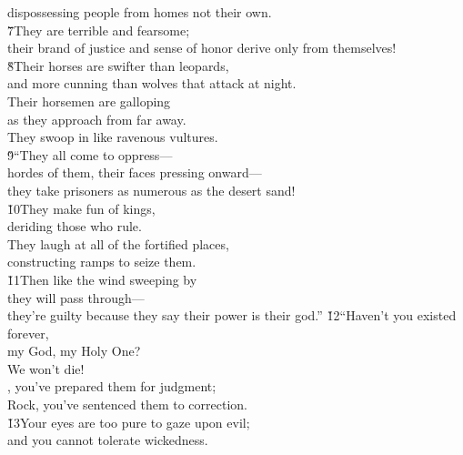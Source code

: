 \begin{poetry}
\poemll    dispossessing people from homes not their own. \\
\poeml \v{7}They are terrible and fearsome; \\
\poemll    their brand of justice and sense of honor derive only from themselves! \\
\poeml \v{8}Their horses are swifter than leopards, \\
\poemll    and more cunning than wolves that attack at night. \\
\poeml Their horsemen are galloping \\
\poemll    as they approach from far away. \\
\poeml They swoop in like ravenous vultures. \\
\poeml \v{9}``They all come to oppress--- \\
\poemll    hordes of them, their faces pressing onward--- \\
\poeml they take prisoners as numerous as the desert sand! \\
\poeml \v{10}They make fun of kings, \\
\poemll    deriding those who rule. \\
\poeml They laugh at all of the fortified places, \\
\poemll    constructing ramps to seize them. \\
\poeml \v{11}Then like the wind sweeping by \\
\poemll    they will pass through--- \\
\poeml they're guilty because they say their power is their god.''
\poeml \v{12}``Haven't you existed forever, \\
\poemll    {} my God, my Holy One? \\
\poemlll       We won't die! \\
\poeml {}, you've prepared them for judgment; \\
\poemll    Rock, you've sentenced them to correction. \\
\poeml \v{13}Your eyes are too pure to gaze upon evil; \\
\poemll    and you cannot tolerate wickedness. \\

\end{poetry}
